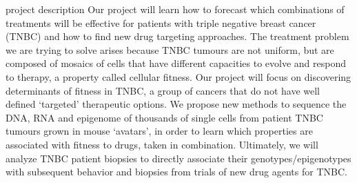 project description
Our project will learn how to forecast which combinations of treatments will be effective for patients with triple
negative breast cancer (TNBC) and how to find new drug targeting approaches. The treatment problem we are
trying to solve arises because TNBC tumours are not uniform, but are composed of mosaics of cells that have
different capacities to evolve and respond to therapy, a property called cellular fitness. Our project will focus on
discovering determinants of fitness in TNBC, a group of cancers that do not have well defined ‘targeted’
therapeutic options. We propose new methods to sequence the DNA, RNA and epigenome of thousands of single
cells from patient TNBC tumours grown in mouse ‘avatars’, in order to learn which properties are associated with
fitness to drugs, taken in combination. Ultimately, we will analyze TNBC patient biopsies to directly associate their
genotypes/epigenotypes with subsequent behavior and biopsies from trials of new drug agents for TNBC.


